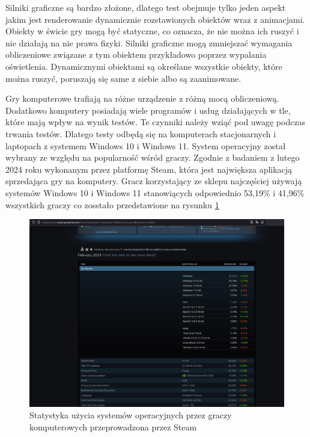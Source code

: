 \documentclass[12pt,twoside]{article}
\begin{document}
Silniki graficzne są bardzo złożone, dlatego test obejmuje tylko jeden aspekt
jakim jest renderowanie dynamicznie rozstawionych obiektów wraz z animacjami.
Obiekty w świcie gry mogą być statyczne, co oznacza, że nie można ich ruszyć i
nie działają na nie prawa fizyki. Silniki graficzne mogą zmniejszać wymagania
obliczeniowe związane z tym obiektem przykładowo poprzez wypalania oświetlenia.
Dynamicznymi obiektami są określane wszystkie obiekty, które można ruszyć,
poruszają się same z siebie albo są zaanimowane.  

Gry komputerowe trafiają na różne urządzenie z różną mocą obliczeniową.
Dodatkowo komputery posiadają wiele programów i usług działających w tle, które
mają wpływ na wynik testów. Te czynniki należy wziąć pod uwagę podczas trwania
testów. Dlatego testy odbędą się na komputerach stacjonarnych i laptopach z
systemem Windows 10 i Windows 11. System operacyjny został wybrany ze względu na popularność
wśród graczy. Zgodnie z badaniem z lutego 2024 roku wykonanym przez platformę
Steam, która jest największa aplikacją sprzedająca gry na komputery. Gracz
korzystający ze sklepu najczęściej używają systemów Windows 10 i Windows 11
stanowiących odpowiednio 53,19\% i 41,96\% wszystkich graczy co zosstało
przedstawione na rysunku
\ref{SteamHardwareSoftwareSurvay}

\begin{figure}[ht]
    \centering
    \includegraphics[width=14cm]{figures/SteamHardwareSoftwareSurvay.png}
    \caption{Statystyka użycia systemów operacyjnych przez graczy komputerowych przeprowadzona przez Steam \cite{SteamSurvey}}
    \label{SteamHardwareSoftwareSurvay}
\end{figure}
\end{document}
